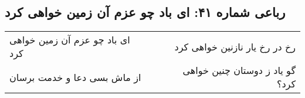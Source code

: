 \begin{center}
\section*{رباعی شماره ۴۱: ای باد چو عزم آن زمین خواهی کرد}
\label{sec:041}
\begin{longtable}{l p{0.5cm} r}
ای باد چو عزم آن زمین خواهی کرد
&&
رخ در رخ یار نازنین خواهی کرد
\\
از ماش بسی دعا و خدمت برسان
&&
گو یاد ز دوستان چنین خواهی کرد؟
\\
\end{longtable}
\end{center}
